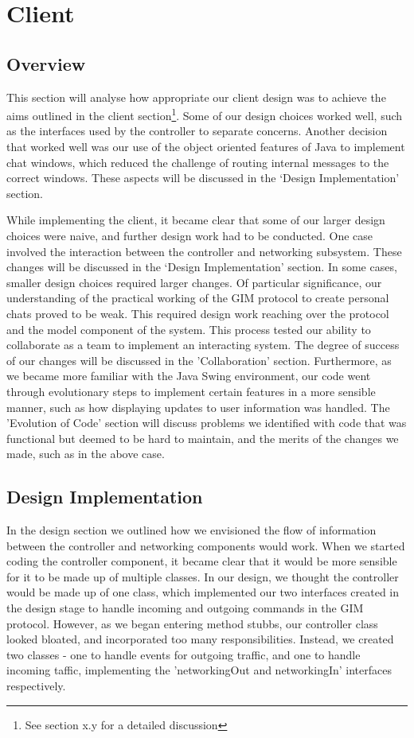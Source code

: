 \section{Client}

\subsection{Overview}

This section will analyse how appropriate our client design was to achieve the aims outlined in the client section\footnote{See section x.y for a detailed discussion}. Some of our design choices worked well, such as the interfaces used by the controller to separate concerns. Another decision that worked well was our use of the object oriented features of Java to implement chat windows, which reduced the challenge of routing internal messages to the correct windows. These aspects will be discussed in the `Design Implementation' section.

While implementing the client, it became clear that some of our larger design choices were naive, and further design work had to be conducted. One case involved the interaction between the controller and networking subsystem. These changes will be discussed in the `Design Implementation' section. In some cases, smaller design choices required larger changes. Of particular significance, our understanding of the practical working of the GIM protocol to create personal chats proved to be weak. This required design work reaching over the protocol and the model component of the system. This process tested our ability to collaborate as a team to implement an interacting system. The degree of success of our changes will be discussed in the 'Collaboration' section. Furthermore, as we became more familiar with the Java Swing environment, our code went through evolutionary steps to implement certain features in a more sensible manner, such as how displaying updates to user information was handled. The 'Evolution of Code' section will discuss problems we identified with code that was functional but deemed to be hard to maintain, and the merits of the changes we made, such as in the above case. 

\subsection{Design Implementation}

In the design section we outlined how we envisioned the flow of information between the controller and networking components would work. When we started coding the controller component, it became clear that it would be more sensible for it to be made up of multiple classes. In our design, we thought the controller would be made up of one class, which implemented our two interfaces created in the design stage to handle incoming and outgoing commands in the GIM protocol. However, as we began entering method stubbs, our controller class looked bloated, and incorporated too many responsibilities. Instead, we created two classes - one to handle events for outgoing traffic, and one to handle incoming taffic, implementing the 'networkingOut and networkingIn' interfaces respectively.

